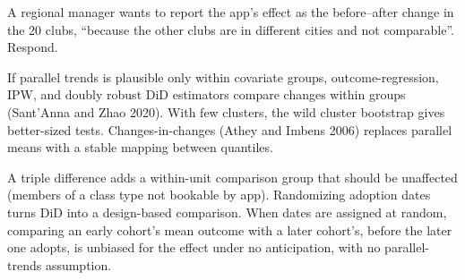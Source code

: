 \documentclass[11pt]{article}
\begin{document}
\begin{exercise}[judgment]
A regional manager wants to report the app's effect as the before--after change in the 20 clubs, ``because the other clubs are in different cities and not
comparable''. Respond.
\end{exercise}

\sectionthree

\begin{extension}
If parallel trends is plausible only within covariate groups, outcome-regression, IPW, and doubly robust DiD estimators compare changes within groups
(Sant'Anna and Zhao 2020). With few clusters, the wild cluster bootstrap gives better-sized tests. Changes-in-changes (Athey and Imbens 2006) replaces
parallel means with a stable mapping between quantiles.
\end{extension}

\begin{extension}
A triple difference adds a within-unit comparison group that should be unaffected (members of a class type not bookable by app). Randomizing adoption
dates turns DiD into a design-based comparison. When dates are assigned at random, comparing an early cohort's mean outcome with a later
cohort's, before the later one adopts, is unbiased for the effect under no anticipation, with no parallel-trends assumption.
\end{extension}
\end{document}
